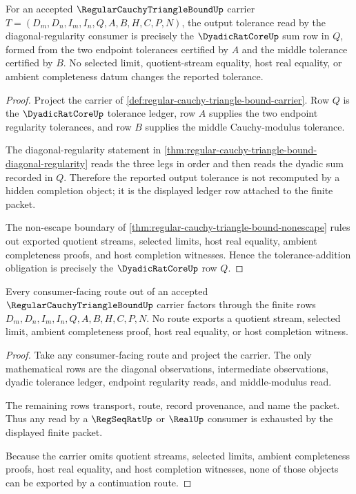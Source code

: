 \begin{theorem}
\label{thm:regular-cauchy-triangle-bound-tolerance-addition-ledger}
For an accepted $\RegularCauchyTriangleBoundUp$ carrier $T=(D_m,D_n,I_m,I_n,Q,A,B,H,C,P,N)$, the output tolerance read by the diagonal-regularity consumer is precisely the $\DyadicRatCoreUp$ sum row in $Q$, formed from the two endpoint tolerances certified by $A$ and the middle tolerance certified by $B$. No selected limit, quotient-stream equality, host real equality, or ambient completeness datum changes the reported tolerance.
\end{theorem}
\begin{proof}
Project the carrier of \autoref{def:regular-cauchy-triangle-bound-carrier}. Row $Q$ is the $\DyadicRatCoreUp$ tolerance ledger, row $A$ supplies the two endpoint regularity tolerances, and row $B$ supplies the middle Cauchy-modulus tolerance.

The diagonal-regularity statement in \autoref{thm:regular-cauchy-triangle-bound-diagonal-regularity} reads the three legs in order and then reads the dyadic sum recorded in $Q$. Therefore the reported output tolerance is not recomputed by a hidden completion object; it is the displayed ledger row attached to the finite packet.

The non-escape boundary of \autoref{thm:regular-cauchy-triangle-bound-nonescape} rules out exported quotient streams, selected limits, host real equality, ambient completeness proofs, and host completion witnesses. Hence the tolerance-addition obligation is precisely the $\DyadicRatCoreUp$ row $Q$.
\end{proof}

\begin{theorem}
\label{thm:regular-cauchy-triangle-bound-nonescape}
Every consumer-facing route out of an accepted $\RegularCauchyTriangleBoundUp$ carrier factors through the finite rows $D_m,D_n,I_m,I_n,Q,A,B,H,C,P,N$. No route exports a quotient stream, selected limit, ambient completeness proof, host real equality, or host completion witness.
\end{theorem}
\begin{proof}
Take any consumer-facing route and project the carrier. The only mathematical rows are the diagonal observations, intermediate observations, dyadic tolerance ledger, endpoint regularity reads, and middle-modulus read.

The remaining rows transport, route, record provenance, and name the packet. Thus any read by a $\RegSeqRatUp$ or $\RealUp$ consumer is exhausted by the displayed finite packet.

Because the carrier omits quotient streams, selected limits, ambient completeness proofs, host real equality, and host completion witnesses, none of those objects can be exported by a continuation route.
\end{proof}

